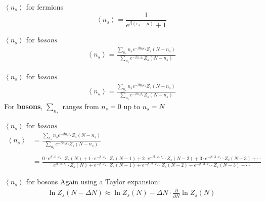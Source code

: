 \documentclass{beamer}
\begin{document}
\begin{frame}{$\left<n_s\right>$ for fermions}
	\begin{equation*}
		\boxed{	\left<n_s\right>=\frac{1}{e^{\beta\left(\epsilon_s-\mu\right)}+1}}
	\end{equation*}

\end{frame}



\begin{frame}{$\left<n_s\right>$ for \textit{bosons}}
	\begin{align*}
	\left<n_s\right>=\frac{\sum_{n_s}n_se^{-\beta n_s\epsilon_s}Z_s(N-n_s)}{\sum_{n_s}e^{-\beta n_s\epsilon_s}Z_s(N-n_s)}
\end{align*}
\end{frame}

\begin{frame}{$\left<n_s\right>$ for \textit{bosons}}
	\begin{align*}
		\left<n_s\right>=\frac{\sum_{n_s}n_se^{-\beta n_s\epsilon_s}Z_s(N-n_s)}{\sum_{n_s}e^{-\beta n_s\epsilon_s}Z_s(N-n_s)}
	\end{align*}
	For \textbf{bosons}, $\sum_{n_s}$ ranges from $n_s=0$ up to $n_s=N$
\end{frame}




\begin{frame}{$\left<n_s\right>$ for \textit{bosons}}
	\tiny
	\begin{align*}
		\left<n_s\right>&=\frac{\sum_{n_s}n_se^{-\beta n_s\epsilon_s}Z_s(N-n_s)}{\sum_{n_s}e^{-\beta n_s\epsilon_s}Z_s(N-n_s)}\\\\
		&=\frac{0\cdot e^{\beta\cdot 0\cdot \epsilon_s}\cdot Z_s(N)+1\cdot e^{-\beta\cdot\epsilon_s}\cdot Z_s(N-1)+2\cdot e^{-\beta\cdot2\cdot\epsilon_s}\cdot Z_s(N-2)+3\cdot e^{-\beta\cdot3\cdot\epsilon_s}\cdot Z_s(N-3)+\cdots}{ e^{\beta\cdot 0\cdot \epsilon_s}\cdot Z_s(N)+ e^{-\beta\cdot\epsilon_s}\cdot Z_s(N-1)+ e^{-\beta\cdot2\cdot\epsilon_s}\cdot Z_s(N-2)+ e^{-\beta\cdot3\cdot\epsilon_s}\cdot Z_s(N-3)+\cdots}
	\end{align*}
\end{frame}



\begin{frame}{$\left<n_s\right>$ for bosons}
	Again using a Taylor expansion:
	\begin{align*}
		\ln{Z_s(N-\Delta N)}\approx \ln{Z_s(N)}-\Delta N\cdot\frac{\partial}{\partial N}\ln{Z_s(N)}
	\end{align*}
	
\end{frame}
\end{document}
